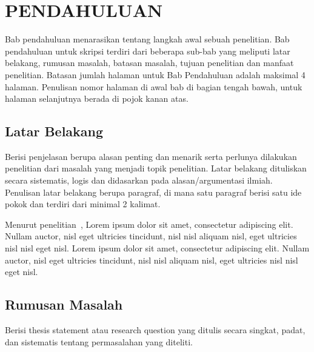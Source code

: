 \chapter{PENDAHULUAN} %

Bab pendahuluan menarasikan tentang langkah awal sebuah penelitian. Bab pendahuluan untuk skripsi terdiri dari beberapa sub-bab yang meliputi latar belakang, rumusan masalah, batasan masalah, tujuan penelitian dan manfaat penelitian. Batasan jumlah halaman untuk Bab Pendahuluan adalah maksimal 4 halaman. Penulisan nomor halaman di awal bab di bagian tengah bawah, untuk halaman selanjutnya berada di pojok kanan atas.

\section{Latar Belakang} %
Berisi penjelasan berupa alasan penting dan menarik serta perlunya dilakukan penelitian dari masalah yang menjadi topik penelitian. Latar belakang dituliskan secara sistematis, logis dan didasarkan pada alasan/argumentasi ilmiah. Penulisan latar belakang berupa paragraf, di mana satu paragraf berisi satu ide pokok dan terdiri dari minimal 2 kalimat.

Menurut penelitian~\cite{sihombing2021comparison}, Lorem ipsum dolor sit amet, consectetur adipiscing elit. Nullam auctor, nisl eget ultricies tincidunt, nisl nisl aliquam nisl, eget ultricies nisl nisl eget nisl. Lorem ipsum dolor sit amet, consectetur adipiscing elit. Nullam auctor, nisl eget ultricies tincidunt, nisl nisl aliquam nisl, eget ultricies nisl nisl eget nisl.

\section{Rumusan Masalah} %
Berisi thesis statement atau research question yang ditulis secara singkat, padat, dan sistematis tentang permasalahan yang diteliti.

